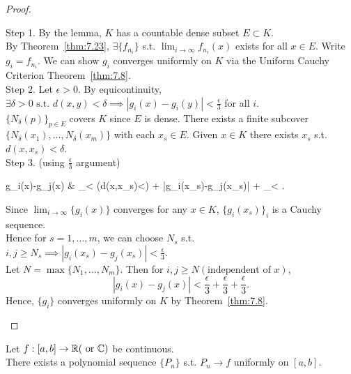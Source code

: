 \begin{thm}[25]
\begin{proof}
\begin{enumerate}
			      Step 1. By the lemma, $K$ has a countable dense subset $E \subset K$.\\
			      By Theorem~\ref{thm:7.23}, $\exists{\{f_{n_i}\}}$ s.t. $\lim_{i\to \infty}{f_{n_i}(x)}$ exists for all $x \in E$.
			      Write $g_{i}=f_{n_i}$. We can show $g_i$ converges uniformly on $K$ via the Uniform Cauchy Criterion Theorem~\ref{thm:7.8}.\\
			      Step 2. Let $\epsilon>0$. By equicontinuity, $\exists{\delta > 0} \text{ s.t. } d(x,y) < \delta \implies \left|g_{i}(x)-g_{i}(y)\right|<\frac{\epsilon}{3}$ for all $i$.\\
			      $\{ {N}_{\delta}(p)\}_{p \in E}$ covers $K$ since $E$ is dense.
			      There exists a finite subcover $\{N_{\delta}(x_1),\ldots ,N_{\delta}(x_{m})\}$ with each $x_s \in E$. Given $x \in K$ there exists $x_s$ s.t. $d(x,x_s)<\delta$.\\
			      Step 3. (using $\frac{\epsilon}{3}$ argument)\\
			      \begin{flalign*}
				      g_{i}(x)-g_{j}(x) & \le {}_{< \;\; (\because d(x,x_s)<\delta)} + \left|g_{i}(x_s)-g_{j}(x_s)\right| + _{<}
				      .\end{flalign*}

			      Since $\lim_{i\to \infty}{\{g_{i}(x)\}}$ converges for any $x \in K$, $\{g_{i}(x_s)\}_i$ is a Cauchy sequence.\\
			      Hence for $s=1,\ldots ,m$, we can choose $N_s$ s.t. $ i,j\ge N_{s}\implies \left|g_{i}(x_{s})-g_{j}(x_{s})\right| <\frac{\epsilon}{3}$.\\
			      Let $N= \max\{N_1,\ldots ,N_m\}$. Then for $i,j\ge N (\text{independent of }x)$,
			      \[
				      \left|g_i(x)-g_j(x)\right|<\frac{\epsilon}{3}+\frac{\epsilon}{3}+\frac{\epsilon}{3}
				      .\]
			      Hence, $\{g_{i}\}$ converges uniformly on $K$ by Theorem~\ref{thm:7.8}.
		\end{enumerate}
	\end{proof}
\end{thm}


\begin{thm}
	Let $f: [a,b]\to \mathbb{R} (\text{ or } \mathbb{C})$ be continuous.\\
	There exists a polynomial sequence $\{ {P}_{n}\}$ s.t. $P_{n}\to f$ uniformly on $[a,b]$.
\end{thm}

